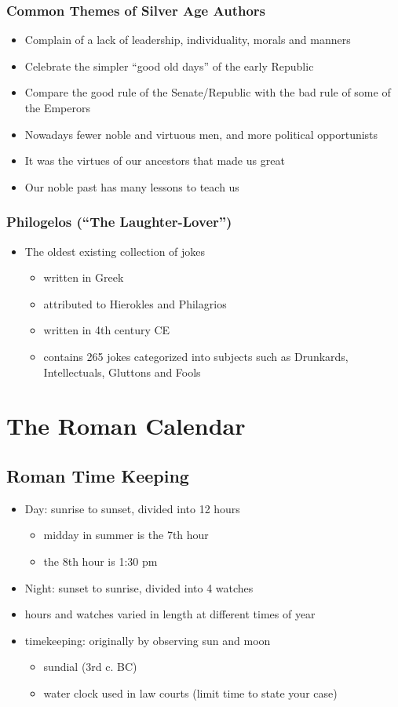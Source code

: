 \documentclass[12pt, twoside]{article}
\begin{document}
\subsubsection{Common Themes of Silver Age Authors}
\begin{itemize}
\item Complain of  a lack of leadership, individuality, morals and manners
\item Celebrate the simpler “good old days” of the early Republic
\item Compare the good rule of the Senate/Republic with the bad rule of some of the Emperors
\item Nowadays fewer noble and virtuous men, and more political opportunists
\item It was the virtues of our ancestors that made us great
\item Our noble past has many lessons to teach us
\end{itemize}
\subsubsection{Philogelos (“The Laughter-Lover”)}
\begin{itemize}
\item The oldest existing collection of jokes
	\begin{itemize}
	\item written in Greek
	\item attributed to Hierokles and Philagrios
	\item written in 4th century CE
	\item contains 265 jokes categorized into subjects such as Drunkards, Intellectuals, Gluttons and Fools
	\end{itemize}
\end{itemize}

\section{The Roman Calendar}
\subsection{Roman Time Keeping}
\begin{itemize}
\item Day: sunrise to sunset, divided into 12 hours
	\begin{itemize}
	\item midday in summer is the 7th hour
	\item the 8th hour is 1:30 pm
	\end{itemize}
\item Night: sunset to sunrise, divided into 4 watches
\item hours and watches varied in length at different times of year
\item timekeeping: originally by observing sun and moon
	\begin{itemize}
	\item sundial (3rd c. BC)
	\item water clock used in law courts (limit time to state your case)
	\end{itemize}
\end{itemize}
\end{document}
